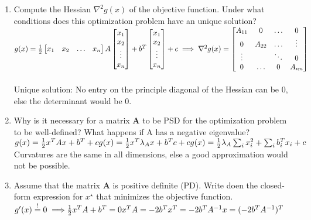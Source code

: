 \begin{enumerate}[label=(\alph*)]
	\item Compute the Hessian $\nabla^{2} g(x)$ of the objective function. Under what conditions does this optimization problem have an unique solution?
		\subitem $ g(x) = \frac{1}{2}\begin{bmatrix} x_{1} & x_{2} & \hdots & x_{n}  \end{bmatrix}A\begin{bmatrix} x_{1} \\ x_{2} \\ \vdots \\ x_{n} \end{bmatrix}
			+ b^{T}\begin{bmatrix} x_{1} \\ x_{2} \\ \vdots \\ x_{n} \end{bmatrix} + c \\
			\implies \nabla^{2} g(x) = \begin{bmatrix} A_{11} & 0 & \hdots & 0 \\ 0 & A_{22} & \hdots & \vdots \\ \vdots & & \ddots & 0 \\ 0 & \hdots & 0 & A_{nn} \end{bmatrix}$ \\
			\\
			Unique solution: No entry on the principle diagonal of the Hessian can be $0$, else the determinant would be $0$.

	\item Why is it necessary for a matrix \textbf{A} to be PSD for the optimization problem to be well-defined? What happens if A has a negative eigenvalue?
		\subitem $g(x) = \frac{1}{2} x^{T}Ax + b^{T} + c\\ g(x) = \frac{1}{2} x^{T}\lambda_A  x + b^{T}c + c \\ g(x)= \frac{1}{2} \lambda_A \sum_{i}x_{i}^{2} + \sum_{i}b_{i}^{T}x_{i} + c \\$
			Curvatures are the same in all dimensions, else a good approximation would not be possible.

\item Assume that the matrix \textbf{A} is positive definite (PD). Write doen the closed-form expression for $x^\star$ that minimizes the objective function.
	\subitem $g^{\prime}(x)\stackrel{!}{=}0 \implies \\ \frac{1}{2}x^{T}A + b^{T} = 0 \\ x^{T}A = -2b^{T} \\ x^{T} = -2b^{T}A^{-1} \\ x = (-2b^{T}A^{-1})^{T}$
\end{enumerate}







